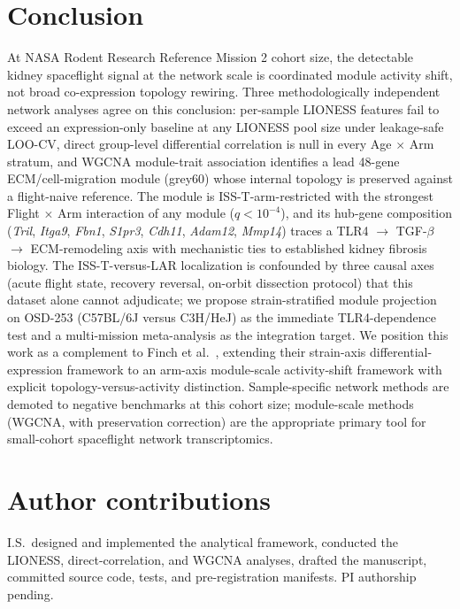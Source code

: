 \documentclass[11pt]{article}
\newcommand{\gene}[1]{\textit{#1}}
\begin{document}
\section{Conclusion}

At NASA Rodent Research Reference Mission 2 cohort size, the detectable kidney spaceflight signal at the network scale is coordinated module activity shift, not broad co-expression topology rewiring. Three methodologically independent network analyses agree on this conclusion: per-sample LIONESS features fail to exceed an expression-only baseline at any LIONESS pool size under leakage-safe LOO-CV, direct group-level differential correlation is null in every Age $\times$ Arm stratum, and WGCNA module-trait association identifies a lead 48-gene ECM/cell-migration module (grey60) whose internal topology is preserved against a flight-naive reference. The module is ISS-T-arm-restricted with the strongest Flight $\times$ Arm interaction of any module ($q < 10^{-4}$), and its hub-gene composition (\gene{Tril}, \gene{Itga9}, \gene{Fbn1}, \gene{S1pr3}, \gene{Cdh11}, \gene{Adam12}, \gene{Mmp14}) traces a TLR4 $\rightarrow$ TGF-$\beta$ $\rightarrow$ ECM-remodeling axis with mechanistic ties to established kidney fibrosis biology. The ISS-T-versus-LAR localization is confounded by three causal axes (acute flight state, recovery reversal, on-orbit dissection protocol) that this dataset alone cannot adjudicate; we propose strain-stratified module projection on OSD-253 (C57BL/6J versus C3H/HeJ) as the immediate TLR4-dependence test and a multi-mission meta-analysis as the integration target. We position this work as a complement to Finch et al.\ \citep{finch2025strain}, extending their strain-axis differential-expression framework to an arm-axis module-scale activity-shift framework with explicit topology-versus-activity distinction. Sample-specific network methods are demoted to negative benchmarks at this cohort size; module-scale methods (WGCNA, with preservation correction) are the appropriate primary tool for small-cohort spaceflight network transcriptomics.

\section*{Author contributions}
I.S.\ designed and implemented the analytical framework, conducted the LIONESS, direct-correlation, and WGCNA analyses, drafted the manuscript, committed source code, tests, and pre-registration manifests. PI authorship pending.
\end{document}
